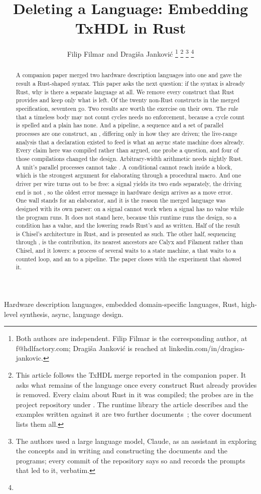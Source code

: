 \documentclass[journal,9pt]{IEEEtran}
\title{Deleting a Language: Embedding TxHDL in Rust}
\author{Filip Filmar and Dragiša Janković%
\thanks{Both authors are independent. Filip Filmar is the
corresponding author, at f@hdlfactory.com; Dragiša Janković is
reached at linkedin.com/in/dragisa-jankovic.}%
\thanks{This article follows the TxHDL merge reported in the companion
paper. It asks what remains of the language once every construct Rust
already provides is removed. Every claim about Rust in it was compiled;
the probes are in the project repository under
\code{experiments/rust\_embedding}. The runtime library the article
describes and the examples written against it are two further
documents~\cite{runtime,examples}; the cover document~\cite{cover}
lists them all.}%
\thanks{The authors used a large language model, Claude, as an
assistant in exploring the concepts and in writing and constructing
the documents and the programs; every commit of the repository says
so and records the prompts that led to it, verbatim.}%
\thanks{\buildstamp}}
\begin{document}
\maketitle

\begin{abstract}
A companion paper merged two hardware description languages into one and
gave the result a Rust-shaped syntax. This paper asks the next question: if
the syntax is already Rust, why is there a separate language at all. We
remove every construct that Rust provides and keep only what is left. Of
the twenty non-Rust constructs in the merged specification, seventeen go.
Two results are worth the exercise on their own. The rule that a timeless
body may not count cycles needs no enforcement, because a cycle count is
spelled  and a plain  has none. And a pipeline, a
sequence and a set of parallel processes are one construct, an , differing only in how they are driven; the live-range analysis that a
 declaration existed to feed is what an async state machine does
already. Every claim here was compiled rather than argued, one probe a question,
and four of those compilations changed the design. Arbitrary-width
arithmetic needs nightly Rust. A unit's parallel processes cannot take
. A  conditional cannot reach inside
a block, which is the strongest argument for elaborating through a
procedural macro. And one driver per wire turns out to be free: a signal
yields its two ends separately, the driving end is not , so
the oldest error message in hardware design arrives as a move error. One
wall stands for an elaborator, and it is the reason the merged language
was designed with its own parser:  on a signal cannot work when a
signal has no value while the program runs. It does not stand here,
because this runtime runs the design, so a condition has a value, and
the lowering reads Rust's  and  as written. Half
of the result is Chisel's architecture in Rust, and is presented as
such. The other half, sequencing through , is the
contribution, its nearest ancestors are Calyx and Filament rather than
Chisel, and it lowers: a process of several waits to a state machine,
a  that waits to a counted loop, and an  to a
pipeline. The paper closes with the experiment that showed it.
\end{abstract}

\begin{IEEEkeywords}
Hardware description languages, embedded domain-specific languages, Rust,
high-level synthesis, async, language design.
\end{IEEEkeywords}
\end{document}
